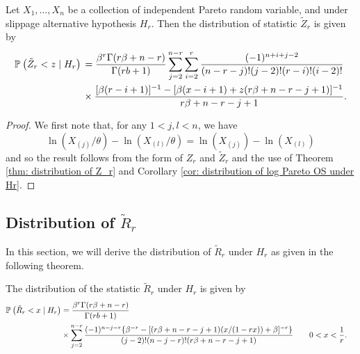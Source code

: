 \documentclass{report}
\begin{document}



\begin{thm}
    Let $X_1,\ldots, X_n$ be a collection of independent Pareto random variable, and
    under slippage alternative hypothesis $H_r$. Then the distribution of statistic $\tilde Z_r$ is given by
    \begin{align*}
        \P{\tilde Z_r < z \mid H_r} \begin{aligned}[t]
            &= \frac{\beta^{r}\Gamma(r\beta+n-r)}{\Gamma(rb+1)} \sum_{j=2}^{n-r} \sum_{i=2}^r  \frac{(-1)^{n+i+j-2}}{(n-r-j)!(j-2)!(r-i)!(i-2)!}
            \\
            & \times \frac{[ \beta(r -i+1)]^{-1} - [\beta(x-i+1) + z(r\beta + n -r -j +1)]^{-1}}{r\beta + n -r - j+ 1}.
        \end{aligned}
    \end{align*}
\end{thm}

\begin{proof}
    We first note that, for any $1 < j , l <n$, we have
    \[ 
        \ln(X_{(j)}/\theta) - \ln(X_{(l)}/\theta) = \ln(X_{(j)}) - \ln(X_{(l)})
    \]
        and so  the result follows from the form of $Z_r$ and $\tilde Z_r$ and the
        use of Theorem \ref{thm: distribution of Z_r} and Corollary \ref{cor: distribution of log Pareto OS under Hr}.
\end{proof}
    
    
\subsection{Distribution of $\tilde R_r$ }
    In this section, we will derive the distribution of $\tilde R_r$ under $H_r$ as given in the following theorem.

    \begin{thm} \label{thm: distribution of  R_r}
        The distribution of the statistic $\tilde R_r$ under $H_r$ is given by
    \begin{align*}
        \P{\tilde R_r< x \mid H_r} &\begin{aligned}[t]
            &= \frac{\beta^{r}\Gamma(r\beta+n-r)}{\Gamma(rb+1)} 
            \\
            &\times \sum_{j=2}^{n-r} \frac{(-1)^{n-j-r}\{\beta^{-r} - [(r\beta + n-r-j+1)(x/(1-rx))+\beta]^{-r}\}}{(j-2)!(n-j-r)!(r\beta+n-r-j+1)} \qquad 0 < x < \frac{1}{r}.
        \end{aligned}
    \end{align*}
    \end{thm}
\end{document}
